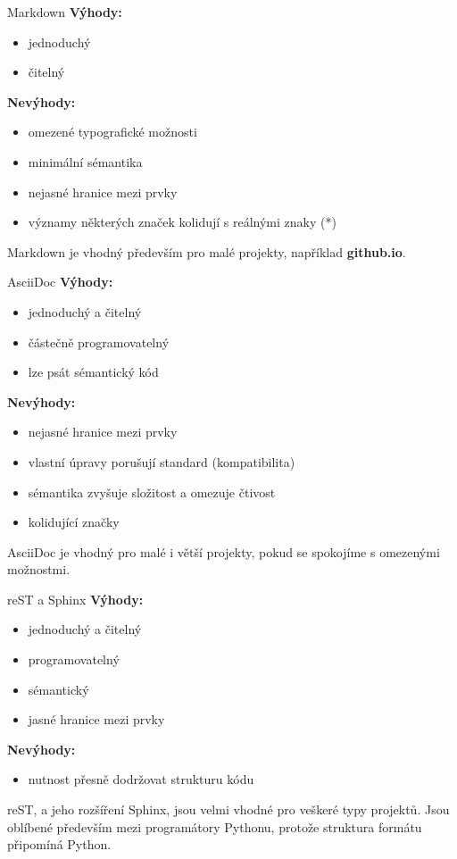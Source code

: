\documentclass[12pt]{beamer}
\begin{document}
	\begin{frame}{Markdown}
	\textbf{Výhody:}
	\begin{itemize}
		\item jednoduchý
		\item čitelný
	\end{itemize}	
	\textbf{Nevýhody:}
	\begin{itemize}
		\item omezené typografické možnosti
		\item minimální sémantika
		\item nejasné hranice mezi prvky
		\item významy některých značek kolidují s reálnými znaky (*)
	\end{itemize}				
	Markdown je vhodný především pro malé projekty, například \textbf{github.io}.
	\end{frame}

	\begin{frame}{AsciiDoc}
	\textbf{Výhody:}
	\begin{itemize}
		\item jednoduchý a čitelný
		\item částečně programovatelný
		\item lze psát sémantický kód
	\end{itemize}	
	\textbf{Nevýhody:}
	\begin{itemize}
		\item nejasné hranice mezi prvky
		\item vlastní úpravy porušují standard (kompatibilita)
		\item sémantika zvyšuje složitost a omezuje čtivost
		\item kolidující značky
	\end{itemize}				
	AsciiDoc je vhodný pro malé i větší projekty, pokud se spokojíme s omezenými možnostmi.
	\end{frame}
    
	\begin{frame}{reST a Sphinx}
	\textbf{Výhody:}
	\begin{itemize}
		\item jednoduchý a čitelný
		\item programovatelný
		\item sémantický
		\item jasné hranice mezi prvky
	\end{itemize}	
	\textbf{Nevýhody:}
	\begin{itemize}
		\item nutnost přesně dodržovat strukturu kódu
	\end{itemize}				
	reST, a jeho rozšíření Sphinx, jsou velmi vhodné pro veškeré typy projektů. Jsou oblíbené především mezi programátory Pythonu, protože struktura formátu připomíná Python.
	\end{frame}
\end{document}
